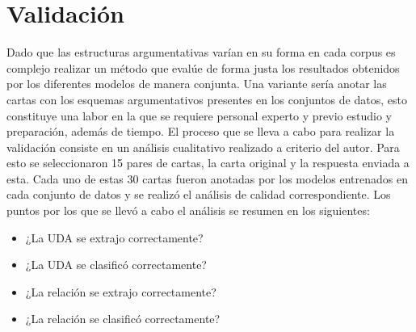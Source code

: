 \documentclass[a4paper,11pt,twocolumn,twoside]{article}
\begin{document}
\begin{table}[h]
	\begin{center}
		\caption{\label{table:comparative_test_abstrct_f1_metrics_segmenter}Métricas comparativas de AbsTRCT.}
	\end{center}
\end{table}

\section{Validación}

Dado que las estructuras argumentativas varían en su forma en cada corpus es complejo realizar un método que evalúe de forma 
justa los resultados obtenidos por los diferentes modelos de manera conjunta. Una variante sería anotar las cartas 
con los esquemas argumentativos presentes en los conjuntos de datos, esto constituye una labor en la que se requiere
personal experto y previo estudio y preparación, además de tiempo. El proceso que se lleva a cabo para realizar la 
validación consiste en un análisis cualitativo realizado a criterio del autor. Para esto se seleccionaron 15 pares 
de cartas, la carta original y la respuesta enviada a esta. Cada uno de estas 30 cartas fueron anotadas por los modelos entrenados en cada 
conjunto de datos y se realizó el análisis de calidad correspondiente. Los puntos por los que se llevó a cabo el análisis
se resumen en los siguientes:

\begin{itemize}
	\item ¿La UDA se extrajo correctamente?
	\item ¿La UDA se clasificó correctamente?
	\item ¿La relación se extrajo correctamente?
	\item ¿La relación se clasificó correctamente?
\end{itemize}
\end{document}
